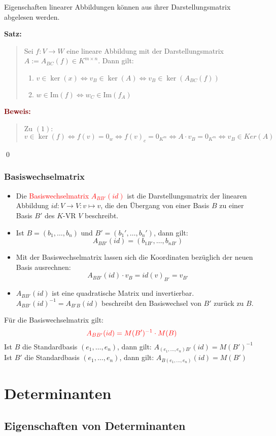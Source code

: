 \documentclass{article}
\newcommand{\red}[1]{\textcolor{red}{#1}}
\newcommand{\dgr}[1]{\textcolor{dgr}{#1}}
\newcommand{\maroon}[1]{\textcolor{maroon}{#1}}
\newcommand{\se}[1]{\dgr{\textbf{Satz: }}\begin{quote}#1\end{quote}}
\newcommand{\pr}[1]{\maroon{\textbf{Beweis: }}\begin{quote}#1\end{quote}\qed}
\newcommand{\im}{\text{Im}}
\begin{document}
Eigenschaften linearer Abbildungen können aus ihrer Darstellungsmatrix abgelesen werden.

\se{
    Sei $f: V \to W$ eine lineare Abbildung mit der Darstellungsmatrix $A := A_{BC}(f) \in K^{m \times n}$. Dann gilt:
    \begin{enumerate}
        \item $v \in \ker(x) \iff v_B \in \ker(A) \iff v_B \in \ker(A_{BC}(f))$
        \item $w \in \im(f) \iff w_C \in \im(f_A)$
    \end{enumerate}
}
\pr{
    Zu $(1)$:\\
    $v \in \ker(f) \iff f(v) = 0_w \iff f(v)_c = 0_{K^m} \iff A \cdot v_B = 0_{K^m} \iff v_B \in Ker(A)$
}

\subsubsection*{Basiswechselmatrix}

\begin{itemize}
    \item Die \red{Basiswechselmatrix $A_{BB'}(id)$} ist die Darstellungsmatrix der linearen Abbildung $id: V \to V: v \mapsto v$, die den Übergang von einer Basis $B$ zu einer Basis $B'$ des $K$-VR $V$ beschreibt.
    \item Ist $B = (b_1, \dots, b_n)$ und $B' = (b_1', \dots, b_n')$, dann gilt:
    $$A_{BB'}(id) = (b_{1B'}, \dots, b_{nB'})$$
    \item Mit der Basiswechselmatrix lassen sich die Koordinaten bezüglich der neuen Basis ausrechnen:
    $$A_{BB'}(id) \cdot v_B = id(v)_{B'} = v_{B'}$$
    \item $A_{BB'}(id)$ ist eine quadratische Matrix und invertierbar.\\
    $A_{BB'}(id)^{-1} = A_{B'B}(id)$ beschreibt den Basiswechsel von $B'$ zurück zu $B$.
\end{itemize}

Für die Basiswechselmatrix gilt:
$$
    \red{A_{BB'}(id) = M(B')^{-1} \cdot M(B)}
$$
Ist $B$ die Standardbasis $(e_1, \dots, e_n)$, dann gilt: $A_{(e_1, \dots, e_n) B'}(id) = M(B')^{-1}$
Ist $B'$ die Standardbasis $(e_1, \dots, e_n)$, dann gilt: $A_{B (e_1, \dots, e_n)}(id) = M(B')$

\section{Determinanten}

\subsection{Eigenschaften von Determinanten}
\end{document}
